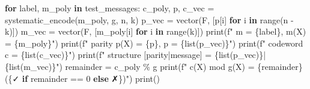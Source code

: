 \documentclass[
]{article}
\newenvironment{Shaded}{}{}
\newcommand{\BuiltInTok}[1]{\textcolor[rgb]{0.00,0.50,0.00}{#1}}
\newcommand{\ControlFlowTok}[1]{\textcolor[rgb]{0.00,0.44,0.13}{\textbf{#1}}}
\newcommand{\DecValTok}[1]{\textcolor[rgb]{0.25,0.63,0.44}{#1}}
\newcommand{\KeywordTok}[1]{\textcolor[rgb]{0.00,0.44,0.13}{\textbf{#1}}}
\newcommand{\NormalTok}[1]{#1}
\newcommand{\OperatorTok}[1]{\textcolor[rgb]{0.40,0.40,0.40}{#1}}
\newcommand{\SpecialCharTok}[1]{\textcolor[rgb]{0.25,0.44,0.63}{#1}}
\newcommand{\SpecialStringTok}[1]{\textcolor[rgb]{0.73,0.40,0.53}{#1}}
\newcommand{\StringTok}[1]{\textcolor[rgb]{0.25,0.44,0.63}{#1}}
\begin{document}
\begin{Shaded}
\begin{Highlighting}[]
\ControlFlowTok{for}\NormalTok{ label, m\_poly }\KeywordTok{in}\NormalTok{ test\_messages:}
\NormalTok{    c\_poly, p, c\_vec }\OperatorTok{=}\NormalTok{ systematic\_encode(m\_poly, g, n, k)}
\NormalTok{    p\_vec }\OperatorTok{=}\NormalTok{ vector(F, [p[i] }\ControlFlowTok{for}\NormalTok{ i }\KeywordTok{in} \BuiltInTok{range}\NormalTok{(n }\OperatorTok{{-}}\NormalTok{ k)])}
\NormalTok{    m\_vec }\OperatorTok{=}\NormalTok{ vector(F, [m\_poly[i] }\ControlFlowTok{for}\NormalTok{ i }\KeywordTok{in} \BuiltInTok{range}\NormalTok{(k)])}
    \BuiltInTok{print}\NormalTok{(}\SpecialStringTok{f"  m = }\SpecialCharTok{\{}\NormalTok{label}\SpecialCharTok{\}}\SpecialStringTok{,  m(X) = }\SpecialCharTok{\{}\NormalTok{m\_poly}\SpecialCharTok{\}}\SpecialStringTok{"}\NormalTok{)}
    \BuiltInTok{print}\NormalTok{(}\SpecialStringTok{f"  parity p(X) = }\SpecialCharTok{\{}\NormalTok{p}\SpecialCharTok{\}}\SpecialStringTok{,  p = }\SpecialCharTok{\{}\BuiltInTok{list}\NormalTok{(p\_vec)}\SpecialCharTok{\}}\SpecialStringTok{"}\NormalTok{)}
    \BuiltInTok{print}\NormalTok{(}\SpecialStringTok{f"  codeword c = }\SpecialCharTok{\{}\BuiltInTok{list}\NormalTok{(c\_vec)}\SpecialCharTok{\}}\SpecialStringTok{"}\NormalTok{)}
    \BuiltInTok{print}\NormalTok{(}\SpecialStringTok{f"  structure [parity|message] = }\SpecialCharTok{\{}\BuiltInTok{list}\NormalTok{(p\_vec)}\SpecialCharTok{\}}\SpecialStringTok{|}\SpecialCharTok{\{}\BuiltInTok{list}\NormalTok{(m\_vec)}\SpecialCharTok{\}}\SpecialStringTok{"}\NormalTok{)}
\NormalTok{    remainder }\OperatorTok{=}\NormalTok{ c\_poly }\OperatorTok{\%}\NormalTok{ g}
    \BuiltInTok{print}\NormalTok{(}\SpecialStringTok{f"  c(X) mod g(X) = }\SpecialCharTok{\{}\NormalTok{remainder}\SpecialCharTok{\}}\SpecialStringTok{  (}\SpecialCharTok{\{}\StringTok{\textquotesingle{}✓\textquotesingle{}} \ControlFlowTok{if}\NormalTok{ remainder }\OperatorTok{==} \DecValTok{0} \ControlFlowTok{else} \StringTok{\textquotesingle{}✗\textquotesingle{}}\SpecialCharTok{\}}\SpecialStringTok{)"}\NormalTok{)}
    \BuiltInTok{print}\NormalTok{()}


\end{Highlighting}
\end{Shaded}
\end{document}
